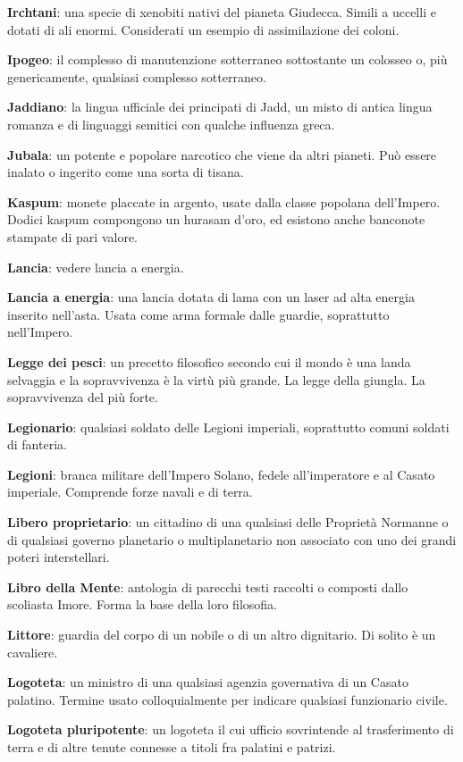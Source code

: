 \textbf{Irchtani}: una specie di xenobiti nativi del pianeta Giudecca.
Simili a uccelli e dotati di ali enormi. Considerati un esempio di
assimilazione dei coloni.

\textbf{Ipogeo}: il complesso di manutenzione sotterraneo sottostante un
colosseo o, più genericamente, qualsiasi complesso sotterraneo.

\textbf{Jaddiano}: la lingua ufficiale dei principati di Jadd, un misto
di antica lingua romanza e di linguaggi semitici con qualche influenza
greca.

\textbf{Jubala}: un potente e popolare narcotico che viene da altri
pianeti. Può essere inalato o ingerito come una sorta di tisana.

\textbf{Kaspum}: monete placcate in argento, usate dalla classe popolana
dell'Impero. Dodici kaspum compongono un hurasam d'oro, ed esistono
anche banconote stampate di pari valore.

\textbf{Lancia}: vedere lancia a energia.

\textbf{Lancia a energia}: una lancia dotata di lama con un laser ad
alta energia inserito nell'asta. Usata come arma formale dalle guardie,
soprattutto nell'Impero.

\textbf{Legge dei pesci}: un precetto filosofico secondo cui il mondo è
una landa selvaggia e la sopravvivenza è la virtù più grande. La legge
della giungla. La sopravvivenza del più forte.

\textbf{Legionario}: qualsiasi soldato delle Legioni imperiali,
soprattutto comuni soldati di fanteria.

\textbf{Legioni}: branca militare dell'Impero Solano, fedele
all'imperatore e al Casato imperiale. Comprende forze navali e di terra.

\textbf{Libero proprietario}: un cittadino di una qualsiasi delle
Proprietà Normanne o di qualsiasi governo planetario o multiplanetario
non associato con uno dei grandi poteri interstellari.

\textbf{Libro della Mente}: antologia di parecchi testi raccolti o
composti dallo scoliasta Imore. Forma la base della loro filosofia.

\textbf{Littore}: guardia del corpo di un nobile o di un altro
dignitario. Di solito è un cavaliere.

\textbf{Logoteta}: un ministro di una qualsiasi agenzia governativa di
un Casato palatino. Termine usato colloquialmente per indicare qualsiasi
funzionario civile.

\textbf{Logoteta pluripotente}: un logoteta il cui ufficio sovrintende
al trasferimento di terra e di altre tenute connesse a titoli fra
palatini e patrizi.

